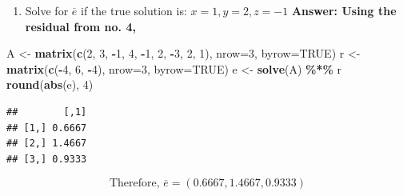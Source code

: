 \documentclass[
]{article}
\newenvironment{Shaded}{\begin{snugshade}}{\end{snugshade}}
\newcommand{\AttributeTok}[1]{\textcolor[rgb]{0.13,0.29,0.53}{#1}}
\newcommand{\ConstantTok}[1]{\textcolor[rgb]{0.56,0.35,0.01}{#1}}
\newcommand{\DecValTok}[1]{\textcolor[rgb]{0.00,0.00,0.81}{#1}}
\newcommand{\FunctionTok}[1]{\textcolor[rgb]{0.13,0.29,0.53}{\textbf{#1}}}
\newcommand{\NormalTok}[1]{#1}
\newcommand{\OtherTok}[1]{\textcolor[rgb]{0.56,0.35,0.01}{#1}}
\newcommand{\SpecialCharTok}[1]{\textcolor[rgb]{0.81,0.36,0.00}{\textbf{#1}}}
\providecommand{\tightlist}{%
  \setlength{\itemsep}{0pt}\setlength{\parskip}{0pt}}
\begin{document}
\begin{enumerate}
\def\labelenumi{\alph{enumi}.}
\setcounter{enumi}{2}
\tightlist
\item
  Solve for \(\overline{e}\) if the true solution is: \(x=1, y=2, z=-1\)
  \textbf{Answer: Using the residual from no. 4,}
\end{enumerate}

\begin{Shaded}
\begin{Highlighting}[]
\NormalTok{A }\OtherTok{\textless{}{-}} \FunctionTok{matrix}\NormalTok{(}\FunctionTok{c}\NormalTok{(}\DecValTok{2}\NormalTok{, }\DecValTok{3}\NormalTok{, }\SpecialCharTok{{-}}\DecValTok{1}\NormalTok{, }\DecValTok{4}\NormalTok{, }\SpecialCharTok{{-}}\DecValTok{1}\NormalTok{, }\DecValTok{2}\NormalTok{, }\SpecialCharTok{{-}}\DecValTok{3}\NormalTok{, }\DecValTok{2}\NormalTok{, }\DecValTok{1}\NormalTok{), }\AttributeTok{nrow=}\DecValTok{3}\NormalTok{, }\AttributeTok{byrow=}\ConstantTok{TRUE}\NormalTok{)}
\NormalTok{r }\OtherTok{\textless{}{-}} \FunctionTok{matrix}\NormalTok{(}\FunctionTok{c}\NormalTok{(}\SpecialCharTok{{-}}\DecValTok{4}\NormalTok{, }\DecValTok{6}\NormalTok{, }\SpecialCharTok{{-}}\DecValTok{4}\NormalTok{), }\AttributeTok{nrow=}\DecValTok{3}\NormalTok{, }\AttributeTok{byrow=}\ConstantTok{TRUE}\NormalTok{)}
\NormalTok{e }\OtherTok{\textless{}{-}} \FunctionTok{solve}\NormalTok{(A) }\SpecialCharTok{\%*\%}\NormalTok{ r}
\FunctionTok{round}\NormalTok{(}\FunctionTok{abs}\NormalTok{(e), }\DecValTok{4}\NormalTok{)}
\end{Highlighting}
\end{Shaded}

\begin{verbatim}
##        [,1]
## [1,] 0.6667
## [2,] 1.4667
## [3,] 0.9333
\end{verbatim}

\[
\boxed{
\text{Therefore, } \overline{e} = (0.6667, 1.4667, 0.9333)
}
\]
\end{document}
